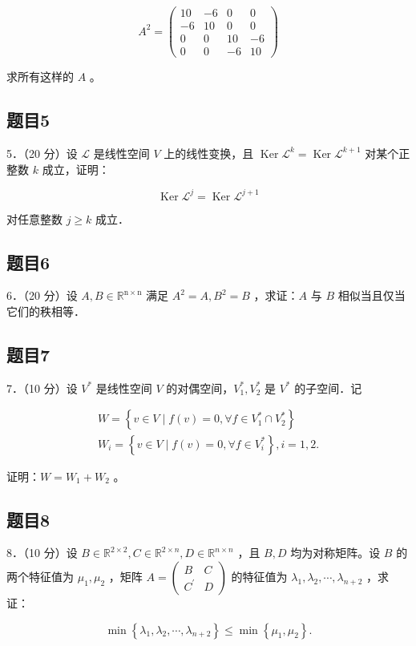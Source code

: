 \documentclass{article}
\begin{document}
\[
A^{2}=\left(\begin{array}{cccc}
10 & -6 & 0 & 0 \\
-6 & 10 & 0 & 0 \\
0 & 0 & 10 & -6 \\
0 & 0 & -6 & 10
\end{array}\right)
\]

求所有这样的 \(A\) 。

\subsection{题目5}
5．（20 分）设 \(\mathcal{L}\) 是线性空间 \(V\) 上的线性变换，且 \(\operatorname{Ker} \mathcal{L}^{k}=\operatorname{Ker} \mathcal{L}^{k+1}\) 对某个正整数 \(k\) 成立，证明：

\[
\operatorname{Ker} \mathcal{L}^{j}=\operatorname{Ker} \mathcal{L}^{j+1}
\]

对任意整数 \(j \geq k\) 成立．

\subsection{题目6}
6．（20 分）设 \(A, B \in \mathbb{R}^{\mathrm{n} \times \mathrm{n}}\) 满足 \(A^{2}=A, B^{2}=B\) ，求证：\(A\) 与 \(B\) 相似当且仅当它们的秩相等．

\subsection{题目7}
7．（10 分）设 \(V^{*}\) 是线性空间 \(V\) 的对偶空间，\(V_{1}^{*}, V_{2}^{*}\) 是 \(V^{*}\) 的子空间．记

\[
\begin{gathered}
W=\left\{v \in V \mid f(v)=0, \forall f \in V_{1}^{*} \cap V_{2}^{*}\right\} \\
W_{i}=\left\{v \in V \mid f(v)=0, \forall f \in V_{i}^{*}\right\}, i=1,2 .
\end{gathered}
\]

证明：\(W=W_{1}+W_{2}\) 。

\subsection{题目8}
8．（10 分）设 \(B \in \mathbb{R}^{2 \times 2}, C \in \mathbb{R}^{2 \times n}, D \in \mathbb{R}^{n \times n}\) ，且 \(B, D\) 均为对称矩阵。设 \(B\) 的两个特征值为 \(\mu_{1}, \mu_{2}\) ，矩阵 \(A=\left(\begin{array}{cc}B & C \\ C^{\prime} & D\end{array}\right)\) 的特征值为 \(\lambda_{1}, \lambda_{2}, \cdots, \lambda_{n+2}\) ，求证：

\[
\min \left\{\lambda_{1}, \lambda_{2}, \cdots, \lambda_{n+2}\right\} \leq \min \left\{\mu_{1}, \mu_{2}\right\} .
\]
\end{document}
